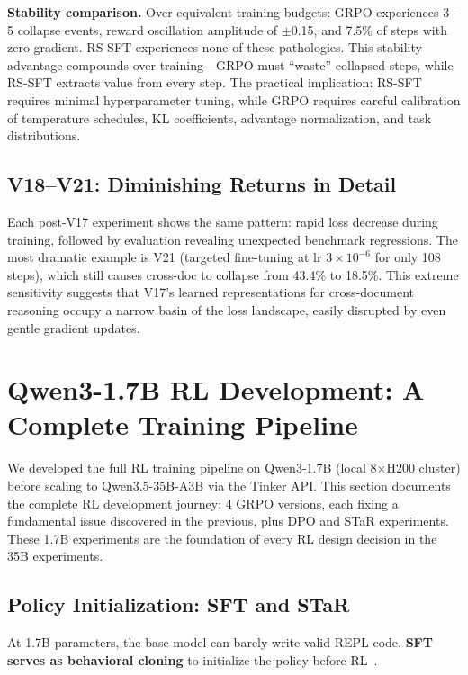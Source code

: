 \documentclass{article}
\begin{document}
\textbf{Stability comparison.} Over equivalent training budgets: GRPO experiences 3--5 collapse events, reward oscillation amplitude of $\pm$0.15, and 7.5\% of steps with zero gradient. RS-SFT experiences none of these pathologies. This stability advantage compounds over training---GRPO must ``waste'' collapsed steps, while RS-SFT extracts value from every step. The practical implication: RS-SFT requires minimal hyperparameter tuning, while GRPO requires careful calibration of temperature schedules, KL coefficients, advantage normalization, and task distributions.

\subsection{V18--V21: Diminishing Returns in Detail}

Each post-V17 experiment shows the same pattern: rapid loss decrease during training, followed by evaluation revealing unexpected benchmark regressions. The most dramatic example is V21 (targeted fine-tuning at lr $3{\times}10^{-6}$ for only 108 steps), which still causes cross-doc to collapse from 43.4\% to 18.5\%. This extreme sensitivity suggests that V17's learned representations for cross-document reasoning occupy a narrow basin of the loss landscape, easily disrupted by even gentle gradient updates.

\section{Qwen3-1.7B RL Development: A Complete Training Pipeline}
\label{app:1.7b}
\label{sec:1.7b-rl}

We developed the full RL training pipeline on Qwen3-1.7B (local 8$\times$H200 cluster) before scaling to Qwen3.5-35B-A3B via the Tinker API. This section documents the complete RL development journey: 4 GRPO versions, each fixing a fundamental issue discovered in the previous, plus DPO and STaR experiments. These 1.7B experiments are the foundation of every RL design decision in the 35B experiments.

\subsection{Policy Initialization: SFT and STaR}

At 1.7B parameters, the base model can barely write valid REPL code. \textbf{SFT serves as behavioral cloning} to initialize the policy before RL~\cite{ouyang2022instructgpt}.
\end{document}

